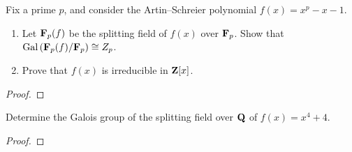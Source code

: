 \begin{problem}
Fix a prime $p$, and consider the Artin--Schreier polynomial
$f(x)=x^p-x-1$.
\begin{enumerate}[noitemsep,label=(\alph*)]
\item Let $\mathbf{F}_p(f)$ be the splitting field of $f(x)$ over $\mathbf{F}_p$. Show
  that $\operatorname{Gal}\left(\mathbf{F}_p(f)/\mathbf{F}_p\right)\cong Z_p$.
\item Prove that $f(x)$ is irreducible in $\mathbf{Z}[x]$.
\end{enumerate}
\end{problem}
\begin{proof}
\end{proof}
\begin{problem}
Determine the Galois group of the splitting field over $\mathbf{Q}$ of
$f(x)=x^4+4$.
\end{problem}
\begin{proof}
\end{proof}


